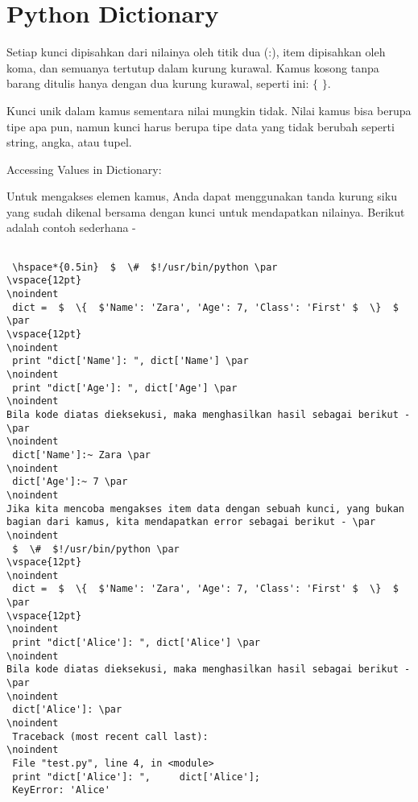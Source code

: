  \section{Python Dictionary}
\vspace{12pt}
\noindent 
Setiap kunci dipisahkan dari nilainya oleh titik dua (:), item dipisahkan oleh koma, dan semuanya tertutup dalam kurung kurawal. Kamus kosong tanpa barang ditulis hanya dengan dua kurung kurawal, seperti ini:  $  \{  $ $  \}  $. \par
\noindent 
Kunci unik dalam kamus sementara nilai mungkin tidak. Nilai kamus bisa berupa tipe apa pun, namun kunci harus berupa tipe data yang tidak berubah seperti string, angka, atau tupel. \par
\vspace{12pt}
\noindent 
\vspace{\baselineskip}
Accessing Values in Dictionary: \par
\noindent 
Untuk mengakses elemen kamus, Anda dapat menggunakan tanda kurung siku yang sudah dikenal bersama dengan kunci untuk mendapatkan nilainya. Berikut adalah contoh sederhana - \par
\noindent 
\begin{verbatim}

 \hspace*{0.5in}  $  \#  $!/usr/bin/python \par
\vspace{12pt}
\noindent 
 dict =  $  \{  $'Name': 'Zara', 'Age': 7, 'Class': 'First' $  \}  $ \par
\vspace{12pt}
\noindent 
 print "dict['Name']: ", dict['Name'] \par
\noindent 
 print "dict['Age']: ", dict['Age'] \par
\noindent 
Bila kode diatas dieksekusi, maka menghasilkan hasil sebagai berikut - \par
\noindent 
 dict['Name']:~ Zara \par
\noindent 
 dict['Age']:~ 7 \par
\noindent 
Jika kita mencoba mengakses item data dengan sebuah kunci, yang bukan bagian dari kamus, kita mendapatkan error sebagai berikut - \par
\noindent 
 $  \#  $!/usr/bin/python \par
\vspace{12pt}
\noindent  
 dict =  $  \{  $'Name': 'Zara', 'Age': 7, 'Class': 'First' $  \}  $ \par
\vspace{12pt}
\noindent 
 print "dict['Alice']: ", dict['Alice'] \par
\noindent 
Bila kode diatas dieksekusi, maka menghasilkan hasil sebagai berikut - \par
\noindent 
 dict['Alice']: \par
\noindent 
 Traceback (most recent call last): 
\noindent 
 File "test.py", line 4, in <module>  
 print "dict['Alice']: ",     dict['Alice'];  
 KeyError: 'Alice' 
\end{verbatim}
